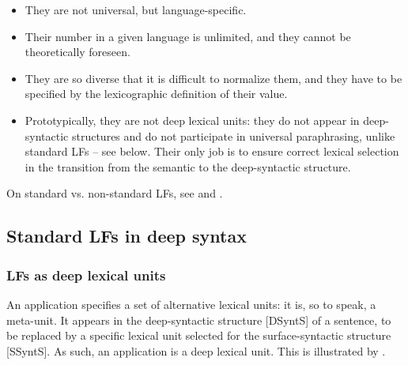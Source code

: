 \begin{itemize}

\item They are not universal, but language-specific.

\item Their number in a given language is unlimited, and they cannot be theoretically foreseen.

\item They are so diverse that it is difficult to normalize them, and they have to be specified by the lexicographic definition of their value.

\item Prototypically, they are not deep lexical units: they do not appear in deep-syntactic structures and do not participate in universal paraphrasing, unlike standard LFs -- see  below. Their only job is to ensure correct lexical selection in the transition from the semantic to the deep-syntactic structure.

\end{itemize}

\begin{furtherreading}
On standard vs. non-standard LFs, see \textcite{Polguere2007a-e} and \textcite[Appendix]{Melcuk2023a}.
\end{furtherreading}

\subsection{Standard LFs in deep syntax}\label{sec:DSyntAndLFs}

\subsubsection{LFs as deep lexical units}\label{sec:LFAsDeepLU}

An application  specifies a set of alternative lexical units: it is, so to speak, a meta-unit. It appears in the deep-syntactic structure [DSyntS] of a sentence, to be replaced by a specific lexical unit selected for the surface-syntactic structure [SSyntS]. As such, an application  is a deep lexical unit. This is illustrated by .

